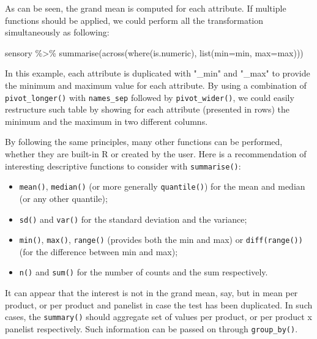 \documentclass[
]{book}
\newenvironment{Shaded}{\begin{snugshade}}{\end{snugshade}}
\newcommand{\AttributeTok}[1]{\textcolor[rgb]{0.77,0.63,0.00}{#1}}
\newcommand{\FunctionTok}[1]{\textcolor[rgb]{0.00,0.00,0.00}{#1}}
\newcommand{\NormalTok}[1]{#1}
\newcommand{\SpecialCharTok}[1]{\textcolor[rgb]{0.00,0.00,0.00}{#1}}
\providecommand{\tightlist}{%
  \setlength{\itemsep}{0pt}\setlength{\parskip}{0pt}}
\begin{document}
As can be seen, the grand mean is computed for each attribute.
If multiple functions should be applied, we could perform all the transformation simultaneously as following:

\begin{Shaded}
\begin{Highlighting}[]
\NormalTok{sensory }\SpecialCharTok{\%\textgreater{}\%} 
  \FunctionTok{summarise}\NormalTok{(}\FunctionTok{across}\NormalTok{(}\FunctionTok{where}\NormalTok{(is.numeric), }\FunctionTok{list}\NormalTok{(}\AttributeTok{min=}\NormalTok{min, }\AttributeTok{max=}\NormalTok{max)))}
\end{Highlighting}
\end{Shaded}

In this example, each attribute is duplicated with "\_min" and "\_max" to provide the minimum and maximum value for each attribute. By using a combination of \texttt{pivot\_longer()} with \texttt{names\_sep} followed by \texttt{pivot\_wider()}, we could easily restructure such table by showing for each attribute (presented in rows) the minimum and the maximum in two different columns.

By following the same principles, many other functions can be performed, whether they are built-in R or created by the user.
Here is a recommendation of interesting descriptive functions to consider with \texttt{summarise()}:

\begin{itemize}
\tightlist
\item
  \texttt{mean()}, \texttt{median()} (or more generally \texttt{quantile()}) for the mean and median (or any other quantile);
\item
  \texttt{sd()} and \texttt{var()} for the standard deviation and the variance;
\item
  \texttt{min()}, \texttt{max()}, \texttt{range()} (provides both the min and max) or \texttt{diff(range())} (for the difference between min and max);
\item
  \texttt{n()} and \texttt{sum()} for the number of counts and the sum respectively.
\end{itemize}

It can appear that the interest is not in the grand mean, say, but in mean per product, or per product and panelist in case the test has been duplicated. In such cases, the \texttt{summary()} should aggregate set of values per product, or per product x panelist respectively. Such information can be passed on through \texttt{group\_by()}.
\end{document}

